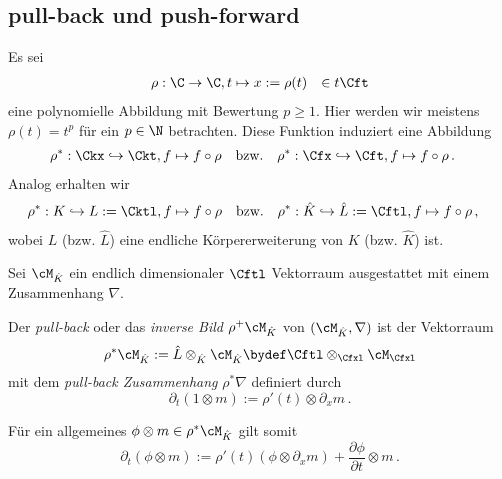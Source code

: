 \subsection{pull-back und push-forward}
\begin{comment}
Nach \cite[1.a]{sabbah_Fourier-local} und \cite[1.3]{hotta2007d}.
\end{comment}
Es sei
\begin{align*}
\rho&:\C\rightarrow \C , t\mapsto x:=\rho(t) &\in t\Cft
\end{align*}
eine polynomielle Abbildung mit  Bewertung $p\geq1$.
Hier werden wir meistens $\rho(t)=t^p$ für ein $p\in \N$ betrachten. Diese
Funktion induziert eine Abbildung
\begin{align*}
\rho^*&:\Ckx\hookrightarrow \Ckt, f \mapsto f\circ \rho & \mbox{bzw.} &&
\rho^*&:\Cfx\hookrightarrow \Cft, f \mapsto f\circ \rho \,.
\end{align*}
Analog erhalten wir
\begin{align*}
\rho^*&:K\hookrightarrow L:=\Cktl, f \mapsto f\circ \rho & \mbox{bzw.} &&
\rho^*&:\hat K\hookrightarrow \hat L:=\Cftl, f \mapsto f\circ \rho \,,
\end{align*}
wobei $L$ (bzw. $\hat L$) eine endliche Körpererweiterung von $K$ (bzw. $\hat
K$) ist.
\begin{comment}
TODO: damit wird $\hat L$ zu einem $\hat K$ Vektorraum.
\end{comment}
Sei $\cM_{\hat K}$ ein endlich dimensionaler $\Cftl$ Vektorraum ausgestattet mit
einem Zusammenhang $\nabla$.
%
\begin{defn} \label{defn:pull-back}
\begin{comment}
\cite[1.a]{sabbah_Fourier-local} und
\cite[Page 34]{sabbah_cimpa90}
\end{comment}
Der \emph{pull-back} oder das \emph{inverse Bild} $\rho^{+}\cM_{\hat K}$ von
$(\cM_{\hat K},\nabla)$ ist der Vektorraum
\[
\rho^{*}\cM_{\hat K}:=\hat L\otimes_{\hat K}\cM_{\hat K}
\bydef\Cftl\otimes_{\Cfxl}\cM_{\Cfxl}
\]
 mit dem \emph{pull-back Zusammenhang} $\rho^*\nabla$ definiert durch
\begin{equation} \label{eq:pull-back-zusammenhang}
\partial_t(1\otimes m):=\rho'(t)\otimes\partial_xm \,.
\end{equation}
\end{defn}
Für ein allgemeines $\phi\otimes m\in \rho^{*}\cM_{\hat K}$ gilt somit
\begin{equation} \label{eq:pull-back-zusammenhang-2}
\partial_t(\phi\otimes m):=\rho'(t)(\phi\otimes\partial_xm) +
  \frac{\partial\phi}{\partial t}\otimes m \,.
\end{equation}
